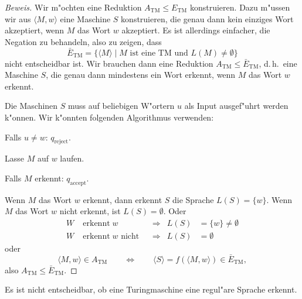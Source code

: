 \begin{proof}[Beweis]
Wir m"ochten eine Reduktion $A_{\text{TM}}\le E_{\text{TM}}$ konstruieren.
Dazu m"ussen wir aus $\langle M,w\rangle$ eine Maschine $S$ konstruieren,
die genau dann kein einziges Wort akzeptiert, wenn $M$ das Wort $w$
akzeptiert. Es ist allerdings einfacher, die Negation zu behandeln,
also zu zeigen, dass 
\[
\bar E_{\text{TM}}=
\{ \langle M\rangle\;|\; \text{$M$ ist eine TM und $L(M)\ne\emptyset$}\}
\]
nicht entscheidbar ist. Wir brauchen dann eine Reduktion
$A_{\text{TM}}\le \bar E_{\text{TM}}$, d.\,h.~eine Maschine $S$,
die genau dann mindestens ein Wort erkennt, wenn $M$ das Wort $w$ 
erkennt.

Die Maschinen $S$ muss auf beliebigen W"ortern $u$ als Input ausgef"uhrt
werden k"onnen. Wir k"onnten folgenden Algorithmus verwenden:
\medskip
\begin{compactenum}
\item Falls $u\ne w$: $q_{\text{reject}}$.
\item Lasse $M$ auf $w$ laufen.
\item Falls $M$ erkennt: $q_{\text{accept}}$.
\end{compactenum}
\medskip
Wenn $M$ das Wort $w$ erkennt, dann erkennt $S$ die Sprache 
$L(S)=\{w\}$. Wenn $M$ das Wort $w$ nicht erkennt, ist $L(S)=\emptyset$.
Oder
\begin{align*}
W&\operatorname{erkennt}w              &&\Rightarrow&L(S)&=\{w\}\ne \emptyset
\\
W&\operatorname{erkennt}w\text{ nicht} &&\Rightarrow&L(S)&=\emptyset
\end{align*}
oder
\[
\langle M,w\rangle \in A_{\text{TM}}
\qquad
\Leftrightarrow
\qquad
\langle S\rangle = f(\langle M,w\rangle)\in
\bar E_{\text{TM}},
\]
also $A_{\text{TM}}\le \bar E_{\text{TM}}$.
\end{proof}

\begin{satz}
Es ist nicht entscheidbar, ob eine Turingmaschine eine regul"are
Sprache erkennt.
\end{satz}

